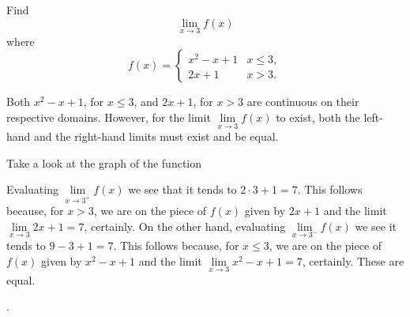 \documentclass{ximera}
\begin{document}
\begin{question}
  Find 
  \[
  \displaystyle \lim_{x\to 3} f(x)
  \]
  where
  \[
  f(x) = \left\{\begin{array}{cl} x^2-x+1 & x\leq 3, \\ 2x+1 & x>3. \end{array}\right.
  \]
  \begin{solution}
    \begin{hint}
     Both $x^2-x+1$, for $x\leq3$, and $2x+1$, for $x>3$ are continuous on their respective domains. However, for the limit $\lim\limits_{x\to3}f(x)$ to exist, both the left-hand and the right-hand limits must exist and be equal.
    \end{hint}
     \begin{hint}
    	Take a look at the graph of the function
    \begin{center}
      \end{center} 
    \end{hint}
    \begin{hint}
     Evaluating $\lim\limits_{x\to3^{+}}f(x)$ we see that it tends to $2\cdot3+1=7$. This follows because, for $x>3$, we are on the piece of $f(x)$ given by $2x+1$ and the limit $\lim\limits_{x\to3}2x+1=7$, certainly. On the other hand, evaluating $\lim\limits_{x\to3^{-}}f(x)$ we see it tends to $9-3+1=7$. This follows because, for $x\leq3$, we are on the piece of $f(x)$ given by $x^2-x+1$ and the limit $\lim\limits_{x\to3}x^2-x+1=7$, certainly. These are equal.
    \end{hint}
    .
  \end{solution}
\end{question}
\end{document}
